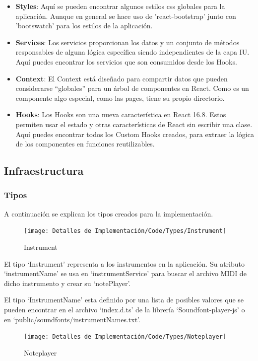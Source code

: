 \documentclass[12pt,twoside,titlepage]{report}
\begin{document}
\begin{itemize}
    \item \textbf{Styles}: Aquí se pueden encontrar algunos estilos css globales para la aplicación. Aunque en general se hace uso de 'react-bootstrap' junto con 'bootswatch' para los estilos de la aplicación.
    \item \textbf{Services}: Los servicios proporcionan los datos y un conjunto de métodos responsables de alguna lógica específica siendo independientes de la capa IU. Aquí puedes encontrar los servicios que son consumidos desde los Hooks.
    \item \textbf{Context}: El Context está diseñado para compartir datos que pueden considerarse “globales” para un árbol de componentes en React. Como es un componente algo especial, como las pages, tiene su propio directorio.
    \item \textbf{Hooks}: Los Hooks son una nueva característica en React 16.8. Estos permiten usar el estado y otras características de React sin escribir una clase. Aquí puedes encontrar todos los Custom Hooks creados, para extraer la lógica de los componentes en funciones reutilizables.
\end{itemize}

\subsection{Infraestructura}
\subsubsection{Tipos}
A continuación se explican los tipos creados para la implementación.

\begin{figure}[H]
    \centering
    \texttt{[image: Detalles de Implementación/Code/Types/Instrument]}
    \label{fig:Instrument}
    \caption{Instrument}
\end{figure}

El tipo ‘Instrument’ representa a los instrumentos en la aplicación. Su atributo ‘instrumentName’ se usa en ‘instrumentService’ para buscar el archivo MIDI de dicho instrumento y crear su ‘notePlayer’.

El tipo ‘InstrumentName’ esta definido por una lista de posibles valores que se pueden encontrar en el archivo ‘index.d.ts’ de la librería ‘Soundfont-player-js’ o en ‘public/soundfonts/instrumentNames.txt’.

\begin{figure}[H]
    \centering
    \texttt{[image: Detalles de Implementación/Code/Types/Noteplayer]}
    \label{fig:Noteplayer}
    \caption{Noteplayer}
\end{figure}
\end{document}
